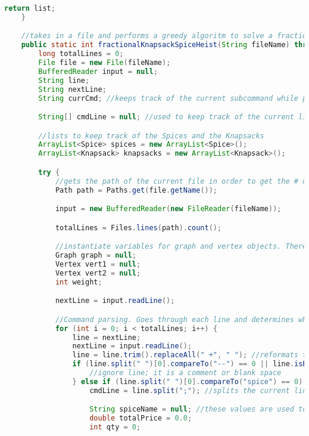 \documentclass[letterpaper, 10pt,DIV=13]{scrartcl}
\numberwithin{equation}{section} %
\numberwithin{figure}{section} %
\numberwithin{table}{section} %
\begin{document}
\begin{lstlisting}[frame=single, language=java, breaklines]
        return list;
    }

    //takes in a file and performs a greedy algoritm to solve a fractional knapsack problem for all spices and knapsacks
    public static int fractionalKnapsackSpiceHeist(String fileName) throws IOException {
        long totalLines = 0;
        File file = new File(fileName);
        BufferedReader input = null;
        String line;
        String nextLine;
        String currCmd; //keeps track of the current subcommand while parsing the file

        String[] cmdLine = null; //used to keep track of the current line for spices by assigning the String.split() String array to it

        //lists to keep track of the Spices and the Knapsacks
        ArrayList<Spice> spices = new ArrayList<Spice>();
        ArrayList<Knapsack> knapsacks = new ArrayList<Knapsack>();

        try {
            //gets the path of the current file in order to get the # of lines
            Path path = Paths.get(file.getName());

            input = new BufferedReader(new FileReader(fileName)); 

            totalLines = Files.lines(path).count();

            //instantiate variables for graph and vertex objects. There are two Vertex objects in the case of adding edges.
            Graph graph = null;
            Vertex vert1 = null;
            Vertex vert2 = null;
            int weight;

            nextLine = input.readLine();

            //Command parsing. Goes through each line and determines what command is being used based on strings.
            for (int i = 0; i < totalLines; i++) {
                line = nextLine;
                nextLine = input.readLine();
                line = line.trim().replaceAll(" +", " "); //reformats the String so that parsing is easier
                if (line.split(" ")[0].compareTo("--") == 0 || line.isEmpty()) {
                    //ignore line; it is a comment or blank space
                } else if (line.split(" ")[0].compareTo("spice") == 0) {
                    cmdLine = line.split(";"); //splits the current line based on ; (each line before a semicolon is a command)

                    String spiceName = null; //these values are used to assign to the Spice that will be added
                    double totalPrice = 0.0;
                    int qty = 0;


\end{lstlisting}
\end{document}
